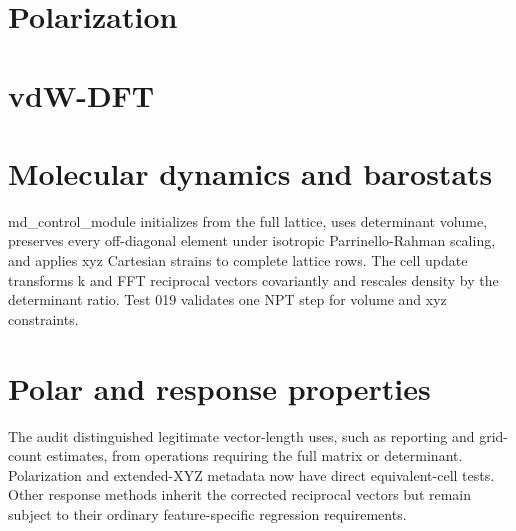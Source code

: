 \documentclass[10pt,a4paper]{report}
\begin{document}
\section{Polarization}
\begin{center}\end{center}
\section{vdW-DFT}
\begin{center}\end{center}
\section{Molecular dynamics and barostats}
md\_control\_module initializes from the full lattice, uses determinant volume, preserves every off-diagonal element under isotropic Parrinello-Rahman scaling, and applies xyz Cartesian strains to complete lattice rows. The cell update transforms k and FFT reciprocal vectors covariantly and rescales density by the determinant ratio. Test 019 validates one NPT step for volume and xyz constraints.

\section{Polar and response properties}
The audit distinguished legitimate vector-length uses, such as reporting and grid-count estimates, from operations requiring the full matrix or determinant. Polarization and extended-XYZ metadata now have direct equivalent-cell tests. Other response methods inherit the corrected reciprocal vectors but remain subject to their ordinary feature-specific regression requirements.
\end{document}
